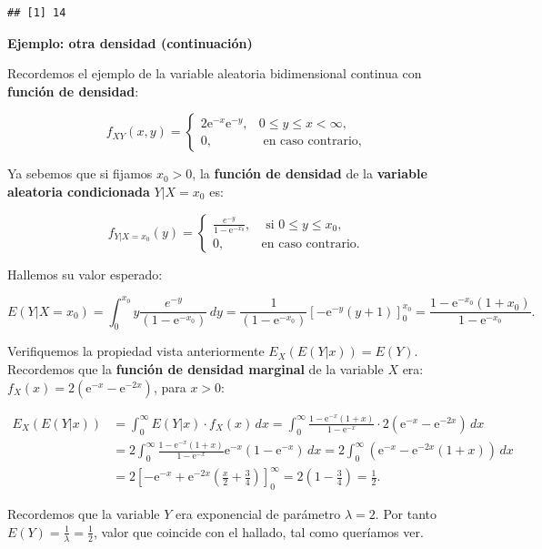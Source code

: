 \documentclass[]{book}
\begin{document}
\begin{verbatim}
## [1] 14
\end{verbatim}

\textbf{Ejemplo: otra densidad (continuación)}

Recordemos el ejemplo de la variable aleatoria bidimensional continua con \textbf{función de densidad}:

\[
f_{XY}(x,y)=\begin{cases}
2 \mathrm{e}^{-x}\mathrm{e}^{-y}, & 0\leq y\leq x < \infty,\\
0, & \mbox{ en caso contrario,}
\end{cases}
\]

Ya sebemos que si fijamos \(x_0>0\), la \textbf{función de densidad} de la \textbf{variable aleatoria condicionada} \(Y|X=x_0\) es:

\[
f_{Y|X=x_0}(y)=\begin{cases}
\frac{e^{-y}}{1-\mathrm{e}^{-x_0}}, & \mbox{ si }0\leq y\leq x_0, \\
0, & \mbox{en caso contrario.}
\end{cases}
\]

Hallemos su valor esperado:

\[
E(Y|X=x_0)=\int_0^{x_0} y \frac{e^{-y}}{(1-\mathrm{e}^{-x_0})}\, dy=\frac{1}{(1-\mathrm{e}^{-x_0})}\left[-\mathrm{e}^{-y} (y+1)\right]_0^{x_0} = \frac{1-\mathrm{e}^{-x_0}(1+x_0)}{1-\mathrm{e}^{-x_0}}.
\]

Verifiquemos la propiedad vista anteriormente \(E_X(E(Y|x))=E(Y)\). Recordemos que la \textbf{función de densidad marginal} de la variable \(X\) era: \(f_X(x)=2\left(\mathrm{e}^{-x}-\mathrm{e}^{-2x}\right)\), para \(x>0\):

\[
\begin{array}{rl}
E_X(E(Y|x)) & =\int_0^\infty E(Y|x)\cdot f_X(x)\, dx = \int_0^\infty \frac{1-\mathrm{e}^{-x}(1+x)}{1-\mathrm{e}^{-x}}\cdot 2\left(\mathrm{e}^{-x}-\mathrm{e}^{-2x}\right)\, dx 
\\ & =  2\int_0^\infty \frac{1-\mathrm{e}^{-x}(1+x)}{1-\mathrm{e}^{-x}} \mathrm{e}^{-x}\left(1-\mathrm{e}^{-x}\right)\, dx = 2 \int_0^\infty \left(\mathrm{e}^{-x}-\mathrm{e}^{-2x}(1+x)\right)\, dx \\ & = 2\left[-\mathrm{e}^{-x}+\mathrm{e}^{-2 x}
   \left(\frac{x}{2}+\frac{3}{4}\right)\right]_0^\infty = 2 \left(1-\frac{3}{4}\right)=\frac{1}{2}.
\end{array}
\]

Recordemos que la variable \(Y\) era exponencial de parámetro \(\lambda=2\). Por tanto \(E(Y)=\frac{1}{\lambda}=\frac{1}{2}\), valor que coincide con el hallado, tal como queríamos ver.
\end{document}
